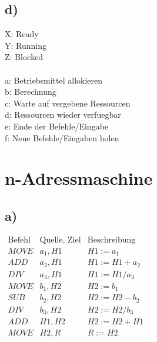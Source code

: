 \documentclass[a4paper,11pt]{scrartcl}
\begin{document}
\subsection*{d)}
X: Ready \\
Y: Running \\
Z: Blocked \\
\\
\noindent
a: Betriebsmittel allokieren\\
b: Berechnung\\
c: Warte auf vergebene Ressourcen\\
d: Ressourcen wieder verfuegbar\\
e: Ende der Befehle/Eingabe\\
f: Neue Befehle/Eingaben holen

\section*{n-Adressmaschine}
\subsection*{a)}
\(
\begin{array}{lll}
	\text{Befehl} & \text{Quelle, Ziel} & \text{Beschreibung} \\
	MOVE & a_1, H1 & H1 := a_1 \\
	ADD  & a_2, H1 & H1 := H1 + a_2 \\
	DIV  & a_3, H1 & H1 := H1 / a_3 \\
	MOVE & b_1, H2 & H2 := b_1 \\
	SUB  & b_2, H2 & H2 := H2 - b_2 \\
	DIV  & b_3, H2 & H2 := H2 / b_3 \\
	ADD  & H1, H2  & H2 := H2 + H1 \\
	MOVE & H2, R   & R := H2
\end{array}
\)
\end{document}
